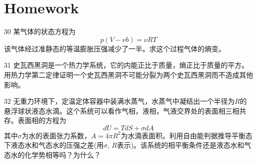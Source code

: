 \documentclass[CJK]{beamer}
\begin{document}
\section{Homework}

\begin{frame}
\bch
{\small
\bitem
\item[30]{某气体的状态方程为
$$p(V- \nu b) = \nu RT$$
该气体经过准静态的等温膨胀压强减少了一半。求这个过程气体的熵变。}
\item[31]{史瓦西黑洞是一个热力学系统，它的内能正比于质量，熵正比于质量的平方。用热力学第二定律证明一个史瓦西黑洞不可能分裂为两个史瓦西黑洞而不造成其他影响。}
\item[32]{无重力环境下，定温定体容器中装满水蒸气，水蒸气中凝结出一个半径为$R$的悬浮球状液态水滴。这个系统可以看作气相，液相，气液交界处的表面相三相共存。表面相的方程为
  $$ dU = TdS + \sigma dA $$
  其中$\sigma$为水的表面张力系数，$A = 4\pi R^2$为水滴表面积。利用自由能判据推导平衡态下液态水和气态水的压强之差(用$\sigma$, $R$表示)。该系统的相平衡条件还是液态水和气态水的化学势相等吗？为什么？}
\eitem
}
\ech
\end{frame}
\end{document}
